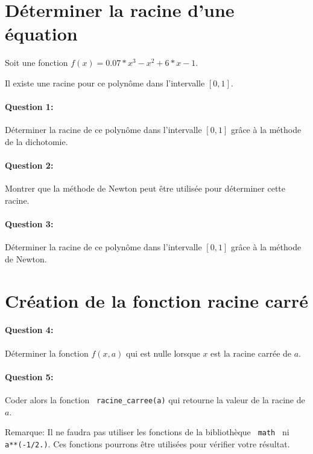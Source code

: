 





\section{Déterminer la racine d'une équation}

Soit une fonction $f(x)=0.07*x^3-x^2+6*x-1$.

Il existe une racine pour ce polynôme dans l'intervalle $\left[0,1\right]$.

\paragraph{Question 1:} Déterminer la racine de ce polynôme dans l'intervalle $\left[0,1\right]$ grâce à la méthode de la dichotomie.

\paragraph{Question 2:} Montrer que la méthode de Newton peut être utilisée pour déterminer cette racine.

\paragraph{Question 3:} Déterminer la racine de ce polynôme dans l'intervalle $\left[0,1\right]$ grâce à la méthode de Newton.

\section{Création de la fonction racine carré}

\paragraph{Question 4:} Déterminer la fonction $f(x,a)$ qui est nulle lorsque $x$ est la racine carrée de $a$.

\paragraph{Question 5:} Coder alors la fonction \verb? racine_carree(a)? qui retourne la valeur de la racine de $a$.

Remarque: Il ne faudra pas utiliser les fonctions de la bibliothèque \verb? math ? ni \verb? a**(-1/2.)?. Ces fonctions pourrons être utilisées pour vérifier votre résultat.




